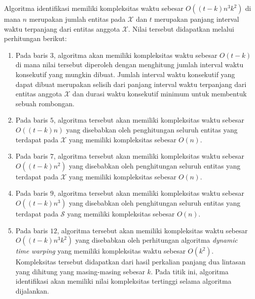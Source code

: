Algoritma identifikasi memiliki kompleksitas waktu sebesar $O((t - k)n^3k^2)$ di mana $n$ merupakan jumlah entitas pada $\mathcal{X}$ dan $t$ merupakan panjang interval waktu terpanjang dari entitas anggota $\mathcal{X}$. Nilai tersebut didapatkan melalui perhitungan berikut:

\begin{enumerate}
    \item Pada baris $3$, algoritma akan memiliki kompleksitas waktu sebesar $O(t - k)$ di mana nilai tersebut diperoleh dengan menghitung jumlah interval waktu konsekutif yang mungkin dibuat. Jumlah interval waktu konsekutif yang dapat dibuat merupakan selisih dari panjang interval waktu terpanjang dari entitas anggota $\mathcal{X}$ dan durasi waktu konsekutif minimum untuk membentuk sebuah rombongan.
    \item Pada baris $5$, algoritma tersebut akan memiliki kompleksitas waktu sebesar $O((t - k)n)$ yang disebabkan oleh penghitungan seluruh entitas yang terdapat pada $\mathcal{X}$ yang memiliki kompleksitas sebesar $O(n)$.
    \item Pada baris $7$, algoritma tersebut akan memiliki kompleksitas waktu sebesar $O((t - k)n^2)$ yang disebabkan oleh penghitungan seluruh entitas yang terdapat pada $\mathcal{X}$ yang memiliki kompleksitas sebesar $O(n)$.
    \item Pada baris $9$, algoritma tersebut akan memiliki kompleksitas waktu sebesar $O((t - k)n^3)$ yang disebabkan oleh penghitungan seluruh entitas yang terdapat pada $\mathcal{S}$ yang memiliki kompleksitas sebesar $O(n)$.
    \item Pada baris $12$, algoritma tersebut akan memiliki kompleksitas waktu sebesar $O((t - k)n^3k^2)$ yang disebabkan oleh perhitungan algoritma \textit{dynamic time warping} yang memiliki kompleksitas waktu sebesar $O(k^2)$. Kompleksitas tersebut didapatkan dari hasil perkalian panjang dua lintasan yang dihitung yang masing-masing sebesar $k$. Pada titik ini, algoritma identifikasi akan memiliki nilai kompleksitas tertinggi selama algoritma dijalankan.
\end{enumerate}
